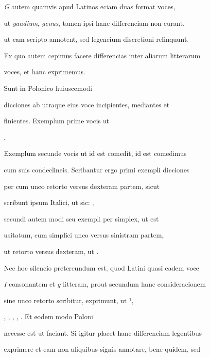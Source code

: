 \indentK \textit{G} autem quamvis apud Latinos eciam duas format voces,

ut \textit{gaudium}, \textit{genus}, tamen ipsi hanc differenciam non curant,

ut eam scripto annotent, sed legencium discretioni relinquunt.

Ex quo autem cepimus facere differencias inter aliarum litterarum

\splitlines

voces, et hanc exprimemus.

\indentK Sunt in Polonico huiuscemodi

\fulllines

dicciones ab utraque eius voce incipientes, mediantes et

finientes. Exemplum prime vocis ut   

      .

Exemplum secunde vocis ut  id est comedit,  id est comedimus

cum suis condeclineis. Scribantur ergo primi exempli dicciones

per  cum unco retorto versus dexteram partem, sicut

scribunt ipsum Italici, ut sic:   ,

secundi autem modi seu exempli per  simplex, ut est

usitatum, cum simplici unco versus sinistram partem,

ut retorto versus dexteram, ut   .

\indentK Nec hoc silencio pretereundum est, quod Latini quasi eadem voce

\textit{I} consonantem et \textit{g} litteram, prout secundum hanc consideracionem

sine unco retorto scribitur, exprimunt, ut ¹,

, , , , . Et eodem modo Poloni

necesse est ut faciant. Si igitur placet hanc differenciam legentibus

exprimere et eam non aliquibus signis annotare, bene quidem, sed

